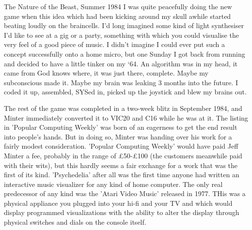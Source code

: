 \begin{q}{The Nature of the Beast, Summer 1984\cite{devdiary}}
I was quite peacefully doing the new game when this idea which had been kicking
around my skull awhile started beating loudly on the braincells. I'd long
imagined some kind of light synthesiser I'd like to see at a gig or a party,
something with which you could visualise the very feel of a good piece of
music. I didn't imagine I could ever put such a concept successfully onto a
home micro, but one Sunday I got back from running and decided to have a
little tinker on my ‘64. An algorithm was in my head, it came from God
knows where, it was just there, complete. Maybe my subconscious made it.
Maybe my brain was leaking 3 months into the future. I coded it up,
assembled, SYSed in, picked up the joystick and blew my brains out.
\end{q}

The rest of the game was completed in a two-week blitz in September 1984, and Minter immediately converted it to VIC20 and C16 while he was at it.
The listing in 'Popular Computing Weekly' was born of an eagerness to get the end result into people's hands. But in doing so, Minter
was handing over his work for a fairly modest consideration. 'Popular Computing Weekly' would have paid Jeff Minter a fee, probably in the range of £50-£100 (the customers meanwhile paid with their wits), but this hardly seems a fair exchange for a work that was the first of its kind.
'Psychedelia' after all was the first time anyone had written an interactive music visualizer for any kind of home computer. The only 
real predecessor of any kind was the 'Atari Video Music' released in 1977. THis was a physical appliance you plugged into your hi-fi and
your TV and which would display programmed visualizations with the ability to alter the display through physical switches and dials on the 
console itself.

\clearpage

